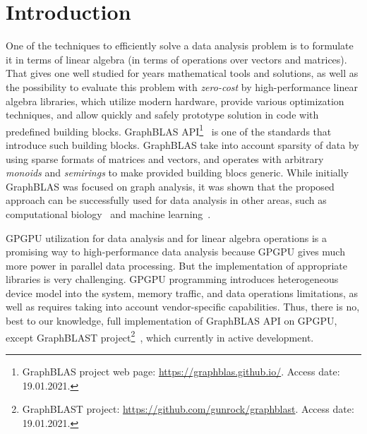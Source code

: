 \section{Introduction}

One of the techniques to efficiently solve a data analysis problem is to formulate it in terms of linear algebra (in terms of operations over vectors and matrices).
That gives one well studied for years mathematical tools and solutions, as well as the possibility to evaluate this problem with \textit{zero-cost} by high-performance linear algebra libraries, which utilize modern hardware, provide various optimization techniques, and allow quickly and safely prototype solution in code with predefined building blocks.
GraphBLAS API\footnote{GraphBLAS project web page: \url{https://graphblas.github.io/}. Access date: 19.01.2021.}~\cite{7761646} is one of the standards that introduce such building blocks.
GraphBLAS take into account sparsity of data by using sparse formats of matrices and vectors, and operates with arbitrary \textit{monoids} and \textit{semirings} to make provided building blocs generic.
While initially GraphBLAS was focused on graph analysis, it was shown that the proposed approach can be successfully used for data analysis in other areas, such as computational biology~\cite{10.5555/3433701.3433800} and machine learning~\cite{8091098}. 

GPGPU utilization for data analysis and for linear algebra operations is a promising way to high-performance data analysis because GPGPU gives much more power in parallel data processing.
But the implementation of appropriate libraries is very challenging.
GPGPU programming introduces heterogeneous device model into the system, memory traffic, and data operations limitations, as well as requires taking into account vendor-specific capabilities.
Thus, there is no, best to our knowledge, full implementation of GraphBLAS API on GPGPU, except GraphBLAST project\footnote{GraphBLAST project: \url{https://github.com/gunrock/graphblast}. Access date: 19.01.2021.}~\cite{yang2019graphblast}, which currently in active development.

